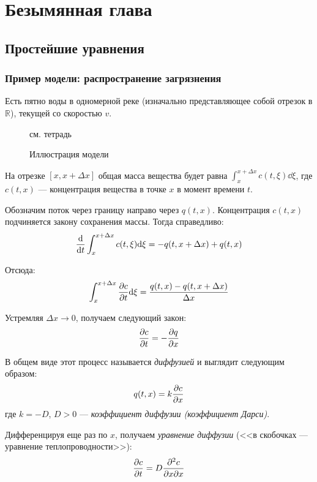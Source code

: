 \section{Безымянная глава}

\subsection{Простейшие уравнения}

\subsubsection{Пример модели: распространение загрязнения}

Есть пятно воды в одномерной реке (изначально представляющее собой отрезок в $\mathbb{R}$), текущей со скоростью $v$.

\begin{figure}[ht]
  \centering
  {\color{gray} см. тетрадь}
  \caption{Иллюстрация модели}
\end{figure}

На отрезке $[x, x + \Delta x]$ общая масса вещества будет равна $\int_x^{x + \Delta x} c(t, \xi) \dd \xi$, где $c(t, x)$ --- концентрация вещества в точке $x$ в момент времени $t$.

Обозначим поток через границу направо через $q(t, x)$. Концентрация $c(t, x)$ подчиняется закону сохранения массы. Тогда справедливо:
%
\begin{equation}
  \dv{t} \int_x^{x + \Delta x} c(t, \xi) \dd \xi = -q(t, x + \Delta x) + q(t, x)
\end{equation}

Отсюда:
%
\begin{equation}
  \int_{x}^{x + \Delta x} \pdv{c}{t} (t, \xi) \dd \xi = \frac{q(t, x) - q(t, x + \Delta x)}{\Delta x}
\end{equation}

Устремляя $\Delta x \to 0$, получаем следующий закон:
%
\begin{equation}
  \pdv{c}{t} (t, x) = - \pdv{q}{x} (t, x)
\end{equation}

В общем виде этот процесс называется \emph{диффузией} и выглядит следующим образом:
%
\begin{equation}
  q(t, x) = k \pdv{c}{x} (t, x)
\end{equation}
%
где $k = -D$, $D > 0$ --- \emph{коэффициент диффузии (коэффициент Дарси)}.

Дифференцируя еще раз по $x$, получаем \emph{уравнение диффузии} (<<в скобочках --- уравнение теплопроводности>>):
%
\begin{equation}
  \pdv{c}{t} (t, x) = D \pdv{c}{x}{x} (t, x)
\end{equation}

